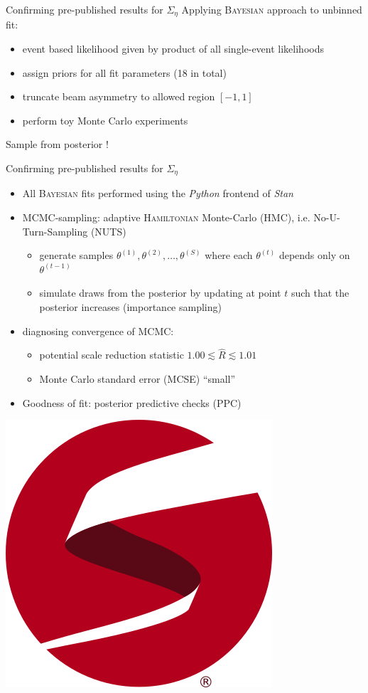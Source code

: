 \documentclass[11pt,aspectratio=169,dvipsnames]{beamer}
\begin{document}
		\begin{frame}{Confirming pre-published results for $\Sigma_\eta$}
		Applying \textsc{Bayesian} approach to unbinned fit:
		\begin{itemize}
			\item event based likelihood given by product of all single-event likelihoods 
			\item assign priors for all fit parameters (18 in total)
			\item truncate beam asymmetry to allowed region $[-1,1]$
			\item perform toy Monte Carlo experiments
		\end{itemize}
		Sample from posterior !
	\end{frame}
	
	\begin{frame}{Confirming pre-published results for $\Sigma_\eta$}
		\begin{itemize}
			\item All \textsc{Bayesian} fits performed using the \emph{Python} frontend of \emph{Stan}
			\item MCMC-sampling: adaptive \textsc{Hamiltonian} Monte-Carlo (HMC), i.e. No-U-Turn-Sampling (NUTS)
			\begin{itemize}
				\item generate samples $\theta^{(1)},\theta^{(2)},\dots,\theta^{(S)}$ where each $\theta^{(t)}$ depends only on $\theta^{(t-1)}$
				\item simulate draws from the posterior by updating at point $t$ such that the posterior increases (importance sampling)
			\end{itemize}
		\item diagnosing convergence of MCMC:
		\begin{itemize}
			\item potential scale reduction statistic $1.00\lesssim\widehat{R}\lesssim1.01$
			\item Monte Carlo standard error (MCSE) \enquote{small}
		\end{itemize}
			\item Goodness of fit: posterior predictive checks (PPC)
		\end{itemize}

	\begin{flushright}
		\includegraphics[width=.1\linewidth]{figs/logo-tm.png}\\
		\cites{stan,nuts}
	\end{flushright}
	\end{frame}
\end{document}
